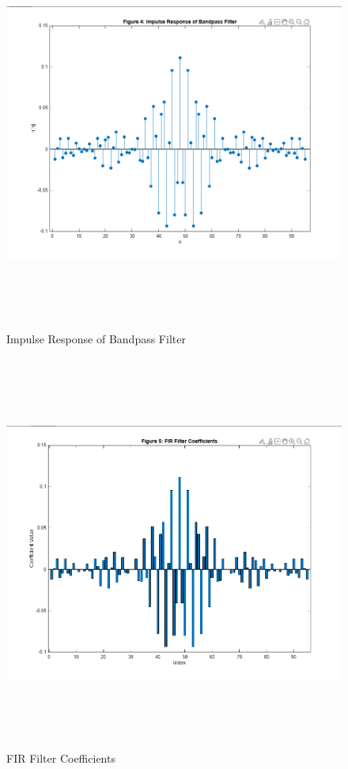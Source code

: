 \documentclass[12pt]{article}
\begin{document}
\begin{figure}[H]
    \centering
    \includegraphics[height=13cm]{g24.png}
    \caption{Impulse Response of Bandpass Filter}
    \label{fig:impulse_response_g2}
\end{figure}

\begin{figure}[H]
    \centering
    \includegraphics[height=13cm]{g25.png}
    \caption{FIR Filter Coefficients}
    \label{fig:coefficients_g2}
\end{figure}
\end{document}

